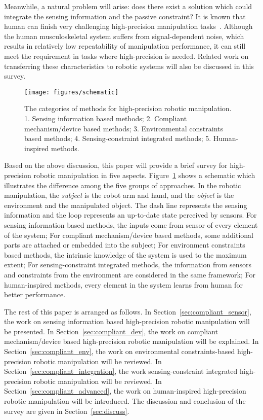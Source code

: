 \documentclass[journal,twoside,web]{ieeecolor}
\begin{document}
Meanwhile, a natural problem will arise: does there exist a solution which could integrate the sensing information and the passive constraint? It is known that human can finish very challenging high-precision manipulation tasks~\cite{Wu2015}. 
Although the human musculoskeletal system suffers from signal-dependent noise, which results in relatively low repeatability of manipulation performance, it can still meet the requirement in tasks where high-precision is needed. Related work on transferring these characteristics to robotic systems will also be discussed in this survey.

\begin{figure}
    \centering
    \texttt{[image: figures/schematic]}
    \caption{The categories of methods for high-precision robotic manipulation. 1. Sensing information based methods; 
    2. Compliant mechanism/device based methods;
    3. Environmental constraints based methods;
    4. Sensing-constraint integrated methods;
    5. Human-inspired methods.}
    \label{fig:schematic}
\end{figure}

Based on the above discussion, this paper will provide a brief survey for high-precision robotic manipulation in five aspects. 
Figure~\ref{fig:schematic} shows a schematic which illustrates the difference among the five groups of approaches. In the robotic manipulation, the \textit{subject} is the robot arm and hand, and the \textit{object} is the environment and the manipulated object. The dash line represents the sensing information and the loop represents an up-to-date state perceived by sensors. For sensing information based methods, the inputs come from sensor of every element of the system; For compliant mechanism/device based methods, some additional parts are attached or embedded into the subject; For environment constraints based methods, the intrinsic knowledge of the system is used to the maximum extent; For sensing-constraint integrated methods, the information from sensors and constraints from the environment are considered in the same framework; For human-inspired methods, every element in the system learns from human for better performance.

The rest of this paper is arranged as follows. 
In Section~\ref{sec:compliant_sensor}, the work on sensing information based high-precision robotic manipulation will be presented. 
In Section~\ref{sec:compliant_dev}, the work on compliant mechanism/device based high-precision robotic manipulation will be explained. 
In Section~\ref{sec:compliant_env}, the work on environmental constraints-based high-precision robotic manipulation will be reviewed. 
In Section~\ref{sec:compliant_integration}, the work sensing-constraint integrated high-precision robotic manipulation will be reviewed. 
In Section~\ref{sec:compliant_advanced}, the work on human-inspired high-precision robotic manipulation will be introduced. The discussion and conclusion of the survey are given in Section~\ref{sec:discuss}.
\end{document}
